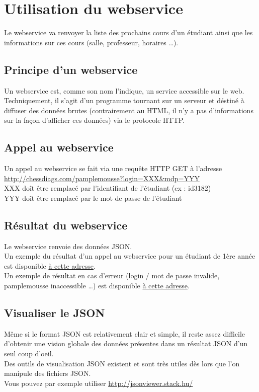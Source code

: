 \documentclass{article}
\begin{document}
\section{Utilisation du webservice}
Le webservice va renvoyer la liste des prochains cours d'un étudiant
ainsi que les informations sur ces cours (salle, professeur, horaires \ldots).\\
\subsection{Principe d'un webservice}
Un webservice est, comme son nom l'indique, un service accessible sur le web.\\
Techniquement, il s'agit d'un programme tournant sur un serveur et déstiné à
diffuser des données brutes (contrairement au HTML, il n'y a pas d'informations
sur la façon d'afficher ces données) via le protocole HTTP.
\subsection{Appel au webservice}
Un appel au webservice se fait via une requête HTTP GET à l'adresse\\
\href{http://chessdiags.com/pamplemousse?login=XXX\&mdp=YYY}{http://chessdiags.com/pamplemousse?login=XXX\&mdp=YYY}\\
XXX doît être remplacé par l'identifiant de l'étudiant (ex : id3182)\\
YYY doît être remplacé par le mot de passe de l'étudiant
\subsection{Résultat du webservice}
Le webservice renvoie des données JSON.\\
Un exemple du résultat d'un appel au webservice pour un étudiant de 1ère année
est disponible \href{http://chessdiags.com/exemple.json}{à cette adresse}.\\
Un exemple de résultat en cas d'erreur (login / mot de passe invalide,
pamplemousse inaccessible \ldots) est disponible
\href{http://chessdiags.com/pamplemousse?login=XXX\&mdp=YYY}{à cette adresse}.
\subsection{Visualiser le JSON} 
Même si le format JSON est relativement clair et simple, il reste assez
difficile d'obtenir une vision globale des données présentes dans un résultat JSON d'un seul coup d'oeil.\\
Des outils de visualisation JSON existent et sont très utiles dès lors que l'on
manipule des fichiers JSON.\\
Vous pouvez par exemple utiliser
\href{http://jsonviewer.stack.hu/}{http://jsonviewer.stack.hu/}
\end{document}
